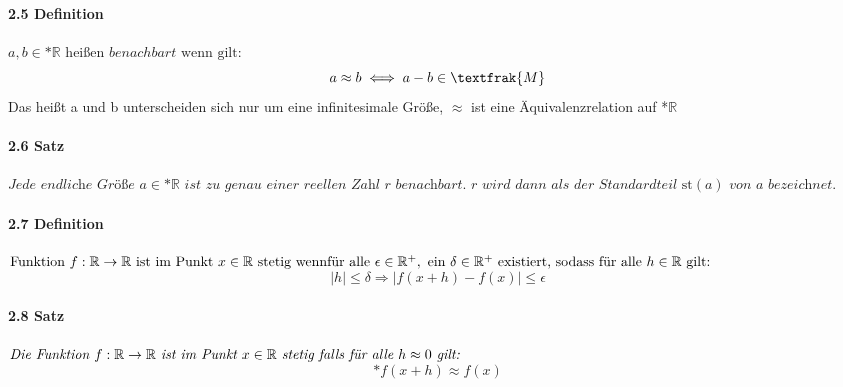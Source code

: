 \documentclass[a4paper]{article}
\begin{document}
\paragraph{2.5 Definition} $a,b \in \text{*}\mathbb{R} \text{ heißen } benachbart \text{ wenn gilt:} $
$$a \approx b \iff a - b \in \textfrak{M}$$
Das heißt a und b unterscheiden sich nur um eine infinitesimale Größe, $\approx$ ist eine Äquivalenzrelation auf *$\mathbb{R}$

\paragraph{2.6 Satz} $ \textit{Jede endliche Größe } a \in \text{*}\mathbb{R} \textit{ ist zu genau einer reellen Zahl r benachbart.}$
$ \textit{r wird dann als der Standardteil } \text{st}(a) \textit{ von a bezeichnet.} $

\paragraph{2.7 Definition} $ \text{Funktion } f:\mathbb{R} \to \mathbb{R} \text{ ist im Punkt } x \in \mathbb{R} \text{ stetig wenn}\\
\text{für alle }\epsilon \in \mathbb{R}^+, \text{ ein } \delta  \in \mathbb{R}^+ \text{ existiert, sodass für alle } h \in \mathbb{R} \text{ gilt:}$
$$  |h| \leqslant \delta \Rightarrow |f(x + h) - f(x)| \leqslant \epsilon $$ 
\paragraph{2.8 Satz} $ \textit{Die Funktion } f:\mathbb{R} \to \mathbb{R} \textit{ ist im Punkt } x \in \mathbb{R} \textit{ stetig}
\textit{ falls für alle }\\ h \approx 0 \textit{ gilt:} $
$$ \text{*}f(x + h) \approx f(x) $$ 
\end{document}
